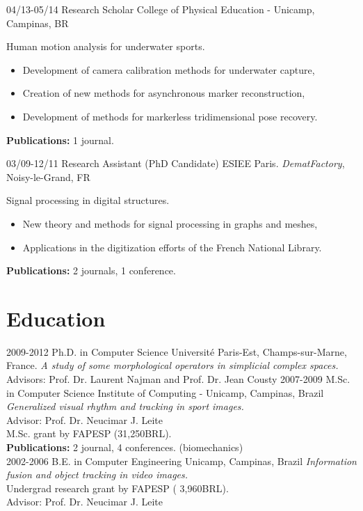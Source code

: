 \documentclass[]{friggeri-cv}
\begin{document}
\begin{entrylist}
   \entry
       {04/13-05/14}
       {Research Scholar}
       {College of Physical Education - Unicamp, Campinas, BR}
       {Human motion analysis for underwater sports.
          \begin{itemize}
           \item{Development of camera calibration methods for underwater capture,}
           \item{Creation of new methods for asynchronous marker reconstruction,}
           \item{Development of methods for markerless tridimensional pose recovery.}
         \end{itemize}
         \textbf{Publications:} 1 journal.\\
       }
       
    \entry
        {03/09-12/11}
        {Research Assistant (PhD Candidate)}
        {ESIEE Paris. \emph{DematFactory}, Noisy-le-Grand, FR}
        {Signal processing in digital structures.
           \begin{itemize}
             \item{New theory and methods for signal processing in graphs and meshes,}
             \item{Applications in the digitization efforts of the French National Library.}
          \end{itemize}
          \textbf{Publications:} 2 journals, 1 conference.\\
        }
        
\end{entrylist}
\clearpage
\section{Education}
\begin{entrylist}
  \entry
    {2009-2012}
    {Ph.D. in Computer Science}
    {Universit{\'e} Paris-Est, Champs-sur-Marne, France.}
    {\emph{A study of some morphological operators in simplicial complex spaces.} \\
    Advisors: Prof. Dr. Laurent Najman and Prof. Dr. Jean Cousty}
  \entry
    {2007-2009}
    {M.Sc. in Computer Science}
    {Institute of Computing - Unicamp, Campinas, Brazil}
    {\emph{Generalized visual rhythm and tracking in sport images.} \\
    Advisor: Prof. Dr. Neucimar J. Leite\\
    M.Sc. grant by FAPESP (31,250BRL).\\
    \textbf{Publications:} 2 journal, 4 conferences. (biomechanics)\\}
  \entry
    {2002-2006}
    {B.E. in Computer Engineering}
    {Unicamp, Campinas, Brazil}
    { \emph{Information fusion and object tracking in video images.}\\
      Undergrad research grant by FAPESP ( 3,960BRL).\\
      Advisor: Prof. Dr. Neucimar J. Leite}
\end{entrylist}
\end{document}
